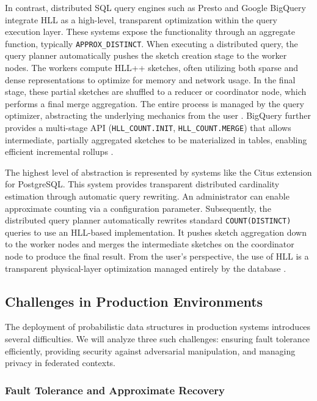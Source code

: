 In contrast, distributed SQL query engines such as Presto and Google BigQuery integrate HLL as a high-level, transparent optimization within the query execution layer. These systems expose the functionality through an aggregate function, typically \texttt{APPROX\_DISTINCT}. When executing a distributed query, the query planner automatically pushes the sketch creation stage to the worker nodes. The workers compute HLL++ sketches, often utilizing both sparse and dense representations to optimize for memory and network usage. In the final stage, these partial sketches are shuffled to a reducer or coordinator node, which performs a final merge aggregation. The entire process is managed by the query optimizer, abstracting the underlying mechanics from the user \cite{Heule2013HyperLogLogIP}. BigQuery further provides a multi-stage API (\texttt{HLL\_COUNT.INIT}, \texttt{HLL\_COUNT.MERGE}) that allows intermediate, partially aggregated sketches to be materialized in tables, enabling efficient incremental rollups \cite{Tao2021Expected1O}.

The highest level of abstraction is represented by systems like the Citus extension for PostgreSQL. This system provides transparent distributed cardinality estimation through automatic query rewriting. An administrator can enable approximate counting via a configuration parameter. Subsequently, the distributed query planner automatically rewrites standard \texttt{COUNT(DISTINCT)} queries to use an HLL-based implementation. It pushes sketch aggregation down to the worker nodes and merges the intermediate sketches on the coordinator node to produce the final result. From the user's perspective, the use of HLL is a transparent physical-layer optimization managed entirely by the database \cite{Harmouch2017CardinalityEA}.

\subsection{Challenges in Production Environments}

The deployment of probabilistic data structures in production systems introduces several difficulties. We will analyze three such challenges: ensuring fault tolerance efficiently, providing security against adversarial manipulation, and managing privacy in federated contexts.

\subsubsection{Fault Tolerance and Approximate Recovery} \label{subsubsec:hll-fault-tolerance}

